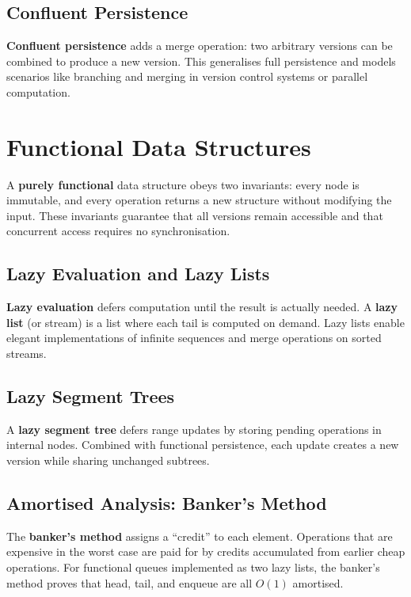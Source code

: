 \subsection{Confluent Persistence}

\textbf{Confluent persistence} adds a merge operation: two arbitrary versions can be combined to produce a new version. This generalises full persistence and models scenarios like branching and merging in version control systems or parallel computation.

\section{Functional Data Structures}
\label{sec21:functional-data-structures}

A \textbf{purely functional} data structure obeys two invariants: every node is immutable, and every operation returns a new structure without modifying the input. These invariants guarantee that all versions remain accessible and that concurrent access requires no synchronisation.

\subsection{Lazy Evaluation and Lazy Lists}

\textbf{Lazy evaluation} defers computation until the result is actually needed. A \textbf{lazy list} (or stream) is a list where each tail is computed on demand. Lazy lists enable elegant implementations of infinite sequences and merge operations on sorted streams.

\subsection{Lazy Segment Trees}

A \textbf{lazy segment tree} defers range updates by storing pending operations in internal nodes. Combined with functional persistence, each update creates a new version while sharing unchanged subtrees.

\subsection{Amortised Analysis: Banker's Method}

The \textbf{banker's method} assigns a ``credit'' to each element. Operations that are expensive in the worst case are paid for by credits accumulated from earlier cheap operations. For functional queues implemented as two lazy lists, the banker's method proves that head, tail, and enqueue are all $O(1)$ amortised.

